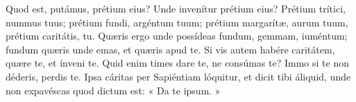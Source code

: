 {\noindent Quod est, putámus, prétium eius? Unde invenítur prétium eius? Prétium trítici, nummus tuus; prétium fundi, argéntum tuum; prétium margarítæ, aurum tuum, prétium caritátis, tu. Quæris ergo unde possídeas fundum, gemmam, iuméntum; fundum quæris unde emas, et quæris apud te. Si vis autem habére caritátem, quære te, et ínveni te. Quid enim times dare te, ne consúmas te? Immo si te non déderis, perdis te. Ipsa cáritas per Sapiéntiam lóquitur, et dicit tibi áliquid, unde non expavéscas quod dictum est: « Da te ipsum. »

\vfill
\pagebreak

 

\vspace{-5mm}


\vfill
\pagebreak
}
\newcommand{\responsoriumbreve}{\pars{Responsorium breve.}

\cuminitiali{VI}{temporalia/resp-christefilidei.gtex}}
\newcommand{\benedictus}{\pars{Canticum Zachariæ.} \scriptura{Mt. 22, 26.37; \textbf{H436}}

\vspace{-4mm}

\antiphona{VIII G}{temporalia/ant-magisterquodestmandatummagnum.gtex}

\vspace{-2mm}

\scriptura{Lc. 1, 68-79}


\initiumpsalmi{temporalia/benedictus-initium-viiisoll-G-auto.gtex}




\antiphona{}{temporalia/ant-magisterquodestmandatummagnum.gtex}}


